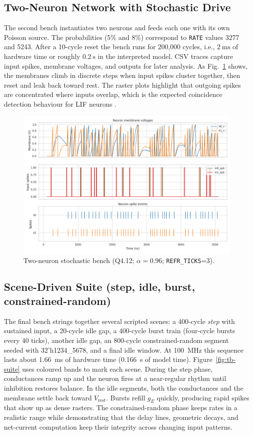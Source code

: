 \documentclass[10pt,onecolumn]{IEEEtran}
\newcommand{\Vrest}{V_{\mathrm{rest}}}
\begin{document}
\subsection{Two-Neuron Network with Stochastic Drive}
The second bench instantiates two neurons and feeds each one with its own Poisson source. The probabilities (5\% and 8\%) correspond to \texttt{RATE} values 3277 and 5243. After a 10-cycle reset the bench runs for 200{,}000 cycles, i.e., \(2~\mathrm{ms}\) of hardware time or roughly \(0.2~\mathrm{s}\) in the interpreted model. CSV traces capture input spikes, membrane voltages, and outputs for later analysis. As Fig.~\ref{fig:tb-simple} shows, the membranes climb in discrete steps when input spikes cluster together, then reset and leak back toward rest. The raster plots highlight that outgoing spikes are concentrated where inputs overlap, which is the expected coincidence detection behaviour for LIF neurons \cite{GerstnerKistler2002,Maass1997}.

\begin{figure}[htbp!]
  \centering
  \includegraphics[width=0.585\linewidth]{snn_simple.png}
  \caption{Two-neuron stochastic bench (Q4.12; \(\alpha=0.96\); \texttt{REFR\_TICKS}=3).}
  \label{fig:tb-simple}
\end{figure}

\subsection{Scene-Driven Suite (step, idle, burst, constrained-random)}
The final bench strings together several scripted scenes: a 400-cycle \emph{step} with sustained input, a 20-cycle idle gap, a 400-cycle burst train (four-cycle bursts every 40 ticks), another idle gap, an 800-cycle constrained-random segment seeded with 32'h1234\_5678, and a final idle window. At 100~MHz this sequence lasts about 1.66~ms of hardware time (0.166~s of model time). Figure~\ref{fig:tb-suite} uses coloured bands to mark each scene. During the step phase, conductances ramp up and the neuron fires at a near-regular rhythm until inhibition restores balance. In the idle segments, both the conductances and the membrane settle back toward \(\Vrest\). Bursts refill \(g_E\) quickly, producing rapid spikes that show up as dense rasters. The constrained-random phase keeps rates in a realistic range while demonstrating that the delay lines, geometric decays, and net-current computation keep their integrity across changing input patterns.
\end{document}
